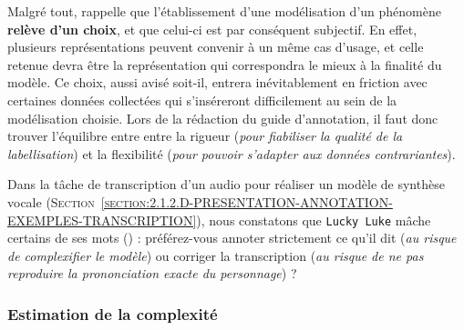 			Malgré tout, \cite{baledent:2022:complexite-annotation-manuelle} rappelle que l'établissement d'une modélisation d'un phénomène \textbf{relève d'un choix}, et que celui-ci est par conséquent subjectif.
			En effet, plusieurs représentations peuvent convenir à un même cas d'usage, et celle retenue devra être la représentation qui correspondra le mieux à la finalité du modèle.
			Ce choix, aussi avisé soit-il, entrera inévitablement en friction avec certaines données collectées qui s'inséreront difficilement au sein de la modélisation choisie.
			Lors de la rédaction du guide d'annotation, il faut donc trouver l'équilibre entre entre la rigueur (\textit{pour fiabiliser la qualité de la labellisation}) et la flexibilité (\textit{pour pouvoir s'adapter aux données contrariantes}).
			\begin{leftBarExamples}
				Dans la tâche de transcription d'un audio pour réaliser un modèle de synthèse vocale (\textsc{Section~\ref{section:2.1.2.D-PRESENTATION-ANNOTATION-EXEMPLES-TRANSCRIPTION}}), nous constatons que \texttt{Lucky Luke} mâche certains de ses mots () : préférez-vous annoter strictement ce qu'il dit (\textit{au risque de complexifier le modèle}) ou corriger la transcription (\textit{au risque de ne pas reproduire la prononciation exacte du personnage}) ?
			\end{leftBarExamples}
		
		\subsubsection{Estimation de la complexité}
		\label{section:2.3.2.B-DEFIS-ANNOTATION-ASPECT-COMPLEXITE-ESTIMATION}
			
